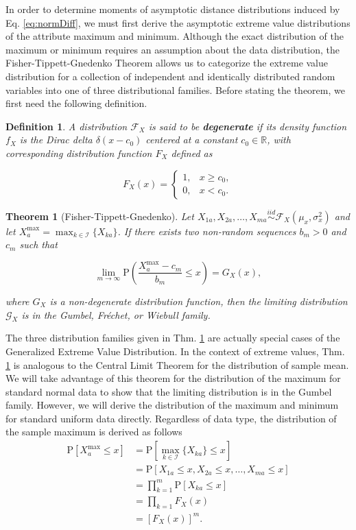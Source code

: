 \documentclass[10pt,letterpaper]{article}\usepackage[]{graphicx}\usepackage[]{color}
\newtheorem{theorem}{Theorem}[section]
\newtheorem{definition}{Definition}[section]
\begin{document}
In order to determine moments of asymptotic distance distributions induced by Eq. \ref{eq:normDiff}, we must first derive the asymptotic extreme value distributions of the attribute maximum and minimum. Although the exact distribution of the maximum or minimum requires an assumption about the data distribution, the Fisher-Tippett-Gnedenko Theorem allows us to categorize the extreme value distribution for a collection of independent and identically distributed random variables into one of three distributional families. Before stating the theorem, we first need the following definition.
%
\begin{definition}
A distribution $\mathcal{F}_X$ is said to be \textbf{degenerate} if its density function $f_X$ is the Dirac delta $\delta(x - c_0)$ centered at a constant $c_0 \in \mathbb{R}$, with corresponding distribution function $F_X$ defined as

\[F_X(x)=\begin{cases}
          1, & x \geq c_0, \\
          0, & x < c_0.
        \end{cases}
\]
\end{definition}
%
\begin{theorem}[Fisher-Tippett-Gnedenko]\label{thm:EVT}
Let $X_{1a},X_{2a},\dots,X_{ma} \overset{iid}{\sim} \mathcal{F}_X\left(\mu_x,\sigma^2_x\right)$ and let $X^\text{max}_a = \displaystyle \max_{k \in \mathcal{I}}\{X_{ka}\}$. If there exists two non-random sequences $b_m>0$ and $c_m$ such that

\[\lim_{m \to \infty} \text{P}\left(\frac{X^\text{max}_a - c_m}{b_m} \leq x\right) = G_X(x),\]

\noindent where $G_X$ is a non-degenerate distribution function, then the limiting distribution $\mathcal{G}_X$ is in the Gumbel, Fr\'{e}chet, or Wiebull family.
\end{theorem}

The three distribution families given in Thm. \ref{thm:EVT} are actually special cases of the Generalized Extreme Value Distribution. In the context of extreme values, Thm. \ref{thm:EVT} is analogous to the Central Limit Theorem for the distribution of sample mean. We will take advantage of this theorem for the distribution of the maximum for standard normal data to show that the limiting distribution is in the Gumbel family. However, we will derive the distribution of the maximum and minimum for standard uniform data directly. Regardless of data type, the distribution of the sample maximum is derived as follows
%
\begin{equation}\label{eq:exact_max}
\begin{aligned}
\text{P}[X^\text{max}_a \leq x] &= \text{P}\left[\max_{k \in \mathcal{I}}\{X_{ka}\} \leq x\right] \\
&= \text{P}[X_{1a} \leq x, X_{2a} \leq x, \dots, X_{ma} \leq x] \\
&= \prod_{k = 1}^{m} \text{P}[X_{ka} \leq x] \\
&= \prod_{k=1} F_X(x) \\
&= [F_X(x)]^m.
\end{aligned}
\end{equation}
\end{document}

